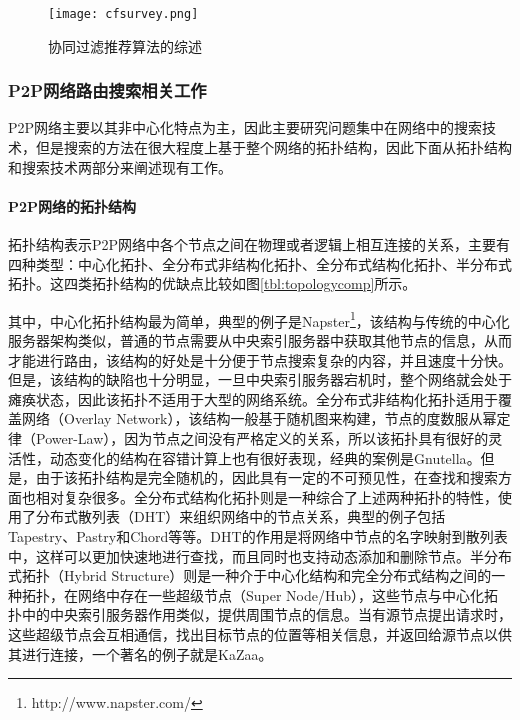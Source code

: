 \begin{figure}
\centering
\texttt{[image: cfsurvey.png]}
\caption{协同过滤推荐算法的综述}
\label{fig:cfsurvey}
\end{figure}

\subsubsection{P2P网络路由搜索相关工作}
P2P网络主要以其非中心化特点为主，因此主要研究问题集中在网络中的搜索技术，但是搜索的方法在很大程度上基于整个网络的拓扑结构，因此下面从拓扑结构和搜索技术两部分来阐述现有工作。

\paragraph{P2P网络的拓扑结构}
拓扑结构表示P2P网络中各个节点之间在物理或者逻辑上相互连接的关系，主要有四种类型：中心化拓扑、全分布式非结构化拓扑、全分布式结构化拓扑、半分布式拓扑。这四类拓扑结构的优缺点比较如图\ref{tbl:topologycomp}所示。

其中，中心化拓扑结构最为简单，典型的例子是Napster\footnote{http://www.napster.com/}，该结构与传统的中心化服务器架构类似，普通的节点需要从中央索引服务器中获取其他节点的信息，从而才能进行路由，该结构的好处是十分便于节点搜索复杂的内容，并且速度十分快。但是，该结构的缺陷也十分明显，一旦中央索引服务器宕机时，整个网络就会处于瘫痪状态，因此该拓扑不适用于大型的网络系统。全分布式非结构化拓扑适用于覆盖网络（Overlay Network），该结构一般基于随机图来构建，节点的度数服从幂定律（Power-Law）\cite{ripeanu2002mapping}，因为节点之间没有严格定义的关系，所以该拓扑具有很好的灵活性，动态变化的结构在容错计算上也有很好表现，经典的案例是Gnutella\cite{ripeanu2001peer}。但是，由于该拓扑结构是完全随机的，因此具有一定的不可预见性，在查找和搜索方面也相对复杂很多。全分布式结构化拓扑则是一种综合了上述两种拓扑的特性，使用了分布式散列表（DHT）来组织网络中的节点关系，典型的例子包括Tapestry\cite{zhao2001tapestry}、Pastry\cite{rowstron2001pastry}和Chord\cite{stoica2001chord}等等。DHT的作用是将网络中节点的名字映射到散列表中，这样可以更加快速地进行查找，而且同时也支持动态添加和删除节点。半分布式拓扑（Hybrid Structure）则是一种介于中心化结构和完全分布式结构之间的一种拓扑，在网络中存在一些超级节点（Super Node/Hub），这些节点与中心化拓扑中的中央索引服务器作用类似，提供周围节点的信息。当有源节点提出请求时，这些超级节点会互相通信，找出目标节点的位置等相关信息，并返回给源节点以供其进行连接，一个著名的例子就是KaZaa\cite{good2003usability}。

